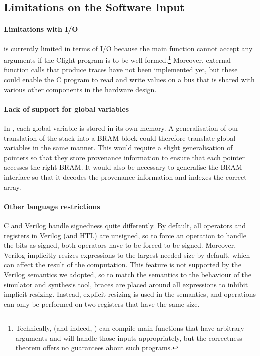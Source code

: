 \subsection{Limitations on the Software Input}


\paragraph{Limitations with I/O}

\vericert{} is currently limited in terms of I/O because the main function cannot accept any arguments if the Clight program is to be well-formed.\footnote{Technically, \vericert{} (and indeed, \compcert{}) can compile main functions that have arbitrary arguments and will handle those inputs appropriately, but the correctness theorem offers no guarantees about such programs.} Moreover, external function calls that produce traces have not been implemented yet, but these could enable the C program to read and write values on a bus that is shared with various other components in the hardware design.

\paragraph{Lack of support for global variables}
In \compcert{}, each global variable is stored in its own memory.  A generalisation of our translation of the stack into a \gls{BRAM} block could therefore translate global variables in the same manner.  This would require a slight generalisation of pointers so that they store provenance information to ensure that each pointer accesses the right \gls{BRAM}. It would also be necessary to generalise the \gls{BRAM} interface so that it decodes the provenance information and indexes the correct array.

\paragraph{Other language restrictions}
C and Verilog handle signedness quite differently. By default, all operators and registers in Verilog (and HTL) are unsigned, so to force an operation to handle the bits as signed, both operators have to be forced to be signed. Moreover, Verilog implicitly resizes expressions to the largest needed size by default, which can affect the result of the computation.  This feature is not supported by the Verilog semantics we adopted, so to match the semantics to the behaviour of the simulator and synthesis tool, braces are placed around all expressions to inhibit implicit resizing.  Instead, explicit resizing is used in the semantics, and operations can only be performed on two registers that have the same size.

